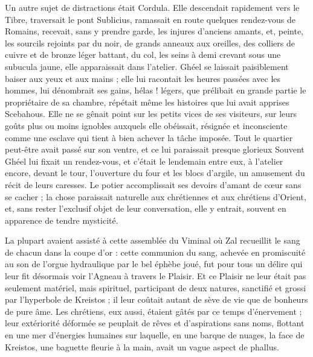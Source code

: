 \documentclass[a4paper, 11pt, oneside, polutonikogreek, french]{article}
\begin{document}
Un autre sujet de distractions était Cordula. Elle descendait rapidement vers le Tibre, traversait le pont Sublicius, ramassait en route quelques rendez-vous de Romains, recevait, sans y prendre garde, les injures d'anciens amants, et, peinte, les sourcils rejoints par du noir, de grands anneaux aux oreilles, des colliers de cuivre et de bronze léger battant, du col, les seins à demi crevant sous une subucula jaune, elle apparaissait dans l'atelier. Ghéel se laissait paisiblement baiser aux yeux et aux mains ; elle lui racontait les heures passées avec les hommes, lui dénombrait ses gains, hélas ! légers, que prélibait en grande partie le propriétaire de sa chambre, répétait même les histoires que lui avait apprises Scebahous. Elle ne se gênait point sur les petits vices de ses visiteurs, sur leurs goûts plus ou moins ignobles auxquels elle obéissait, résignée et inconsciente comme une esclave qui tient à bien achever la tâche imposée. Tout le quartier peut-être avait passé sur son ventre, et ce lui paraissait presque glorieux Souvent Ghéel lui fixait un rendez-vous, et c'était le lendemain entre eux, à l'atelier encore, devant le tour, l'ouverture du four et les blocs d'argile, un amusement du récit de leurs caresses. Le potier accomplissait ses devoirs d'amant de cœur sans se cacher ; la chose paraissait naturelle aux chrétiennes et aux chrétiens d'Orient, et, sans rester l'exclusif objet de leur conversation, elle y entrait, souvent en apparence de tendre mysticité.

La plupart avaient assisté à cette assemblée du Viminal où Zal recueillit le sang de chacun dans la coupe d'or : cette communion du sang, achevée en promiscuité au son de l'orgue hydraulique par le bel éphèbe joué, fut pour tous un délire qui leur fit désormais voir l'Agneau à travers le Plaisir. Et ce Plaisir ne leur était pas seulement matériel, mais spirituel, participant de deux natures, sanctifié et grossi par l'hyperbole de Kreistos ; il leur coûtait autant de sève de vie que de bonheurs de pure âme. Les chrétiens, eux aussi, étaient gâtés par ce temps d'énervement ; leur extériorité déformée se peuplait de rêves et d'aspirations sans noms, flottant en une mer d'énergies humaines sur laquelle, en une barque de nuages, la face de Kreistos, une baguette fleurie à la main, avait un vague aspect de phallus.
\end{document}

